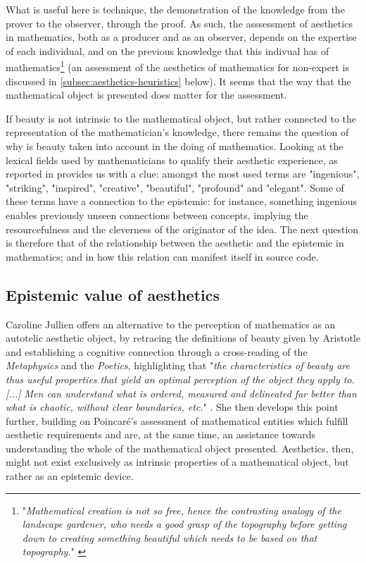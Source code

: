 What is useful here is technique, the demonstration of the knowledge from the prover to the observer, through the proof. As such, the asssessment of aesthetics in mathematics, both as a producer and as an observer, depends on the expertise of each individual, and on the previous knowledge that this indivual has of mathematics\footnote{"\emph{Mathematical creation is not so free, hence the contrasting analogy of the landscape gardener, who needs a good grasp of the topography before getting down to creating something beautiful which needs to be based on that topography.}" \citep{thomas_beauty_2017}} (an assessment of the aesthetics of mathematics for non-expert is discussed in \ref{subsec:aesthetics-heuristics} below). It seems that the way that the mathematical object is presented does matter for the assessment.

If beauty is not intrinsic to the mathematical object, but rather connected to the representation of the mathematician's knowledge, there remains the question of why is beauty taken into account in the doing of mathematics. Looking at the lexical fields used by mathematicians to qualify their aesthetic experience, as reported in \citep{inglis_beauty_2015} provides us with a clue: amongst the most used terms are "ingenious", "striking", "inspired", "creative", "beautiful", "profound" and "elegant". Some of these terms have a connection to the epistemic: for instance, something ingenious enables previously unseen connections between concepts, implying the resourcefulness and the cleverness of the originator of the idea. The next question is therefore that of the relationship between the aesthetic and the epistemic in mathematics; and in how this relation can manifest itself in source code.

\subsection{Epistemic value of aesthetics}
\label{subsec:epistemic-aesthetics}

Caroline Jullien offers an alternative to the perception of mathematics as an autotelic aesthetic object, by retracing the definitions of beauty given by Aristotle and establishing a cognitive connection through a cross-reading of the \emph{Metaphysics} and the \emph{Poetics}, highlighting that "\emph{the characteristics of beauty are thus useful properties that yield an optimal perception of the object they apply to. [...] Men can understand what is ordered, measured and delineated far better than what is chaotic, without clear boundaries, etc.}" \citep{jullien_languages_2012}. She then develops this point further, building on Poincaré's assessment of mathematical entities which fulfill aesthetic requirements and are, at the same time, an assistance towards understanding the whole of the mathematical object presented. Aesthetics, then, might not exist exclusively as intrinsic properties of a mathematical object, but rather as an epistemic device.

